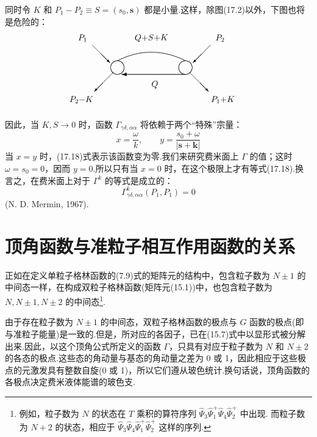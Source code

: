 同时令 $K$ 和 $P_1-P_2\equiv S=(s_0,\bm{s})$ 都是小量.这样，除图(17.2)以外，下图也将是危险的：
\begin{equation*}
  \setlength{\unitlength}{0.80pt}%
  \begin{picture}(310,112)(0,0)
    \put(58,94){\vector(1,-1){26}}%
    \put(232,94){\vector(-1,-1){26}}%
    \qbezier(95,51)(104.14,51.86)(105,61)%
    \qbezier(105,61)(104.14,70.14)(95,71)%
    \qbezier(95,71)(85.86,70.14)(85,61)%
    \qbezier(85,61)(85.86,51.86)(95,51)%
    \qbezier(195,51)(204.14,51.86)(205,61)%
    \qbezier(205,61)(204.14,70.14)(195,71)%
    \qbezier(195,71)(185.86,70.14)(185,61)%
    \qbezier(185,61)(185.86,51.86)(195,51)%
    \qbezier(95,71)(145,96)(195,71)%
    \put(145,104){\makebox(0,0){$Q{+}S{+}K$}}%
    \tarrL{195}{51}{94}%
    \put(150,36){\makebox(0,0){$Q$}}%
    \put(89,54){\vector(-1,-1){28}}%
    \put(201,54){\vector(1,-1){28}}%
    \put(44,104){\makebox(0,0){$P_1$}}%
    \put(246,104){\makebox(0,0){$P_2$}}%
    \put(42,14){\makebox(0,0){$P_2{-}K$}}%
    \put(250,14){\makebox(0,0){$P_1{+}K$}}%
  \end{picture}
\end{equation*}
因此，当 $K,S\to0$ 时，函数 $\Gamma_{\gamma\delta,\alpha\alpha}$ 将依赖于两个“特殊”宗量：
\begin{equation*}
  x=\frac{\omega}{k},\qquad y=\frac{s_0+\omega}{|\bm{s}+\bm{k}|}
\end{equation*}
当 $x=y$ 时，(17.18)式表示该函数变为零.我们来研究费米面上 $\Gamma$ 的值；这时 $\omega=s_0=0$，因而 $y=0$.所以只有当 $x=0$ 时，在这个极限上才有等式(17.18).换言之，在费米面上对于 $\Gamma^{k}$ 的等式是成立的：
\begin{equation}
  \Gamma^{k}_{\gamma\delta,\alpha\alpha}(P_1,P_1)=0
\end{equation}
(N. D. Mermin, 1967).

\section{顶角函数与准粒子相互作用函数的关系}

正如在定义单粒子格林函数的(7.9)式的矩阵元的结构中，包含粒子数为 $N\pm1$ 的中间态一样，在构成双粒子格林函数(矩阵元(15.1))中，也包含粒子数为 $N,N\pm1,N\pm2$ 的中间态\footnote{例如，粒子数为 $N$ 的状态在 $T$ 乘积的算符序列 $\hat{\Psi}_3\hat{\Psi}^{+}_1\hat{\Psi}_4\hat{\Psi}^{+}_2$ 中出现. 而粒子数为 $N+2$ 的状态，相应于 $\hat{\Psi}_3\hat{\Psi}_4\hat{\Psi}^{+}_1\hat{\Psi}^{+}_2$ 这样的序列.}.

由于存在粒子数为 $N\pm1$ 的中间态，双粒子格林函数的极点与 $G$ 函数的极点(即与准粒子能量)是一致的.但是，所对应的各因子，已在(15.7)式中以显形式被分解出来.因此，以这个顶角公式所定义的函数 $\Gamma$，只具有对应于粒子数为 $N$ 和 $N\pm2$ 的各态的极点.这些态的角动量与基态的角动量之差为 0 或 1，因此相应于这些极点的元激发具有整数自旋(0 或 1)，所以它们遵从玻色统计.换句话说，顶角函数的各极点决定费米液体能谱的玻色支.

